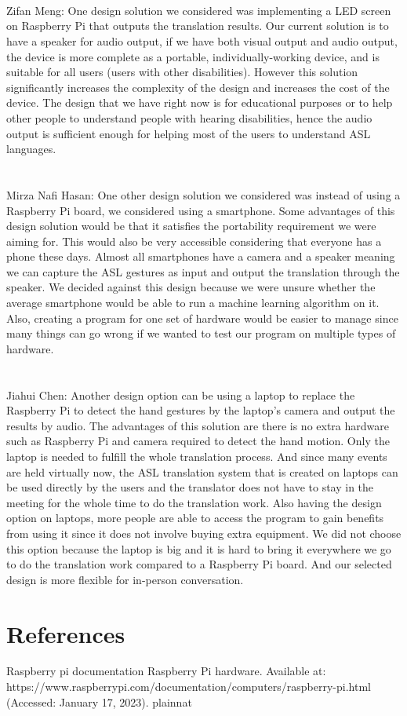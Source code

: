 \documentclass[12pt, titlepage]{article}
\begin{document}
\begin{enumerate}
  \\
  ~\\
  \\
  Zifan Meng: One design solution we considered was implementing a LED screen on Raspberry Pi that outputs the translation results. Our current solution 
  is to have a speaker for audio output, if we have both visual output and audio output, the device is more complete as a portable, individually-working 
  device, and is suitable for all users (users with other disabilities). However this solution significantly increases the complexity of the design and 
  increases the cost of the device. The design that we have right now is for educational purposes or to help other people to understand people with hearing disabilities, 
  hence the audio output is sufficient enough for helping most of the users to understand ASL languages.
  \\
  ~\\
  \\
    Mirza Nafi Hasan: One other design solution we considered was instead of using a Raspberry Pi board, we considered using a smartphone. Some advantages of 
    this design solution would be that it satisfies the portability requirement we were aiming for. This would also be very accessible considering that everyone
    has a phone these days. Almost all smartphones have a camera and a speaker meaning we can capture the ASL gestures as input and output the translation 
    through the speaker. We decided against this design because we were unsure whether the average smartphone would be able to run a machine learning algorithm
    on it. Also, creating a program for one set of hardware would be easier to manage since many things can go wrong if we wanted to test our program on 
    multiple types of hardware.
    \\
    ~\\
    \\
  Jiahui Chen: Another design option can be using a laptop to replace the Raspberry Pi to detect the hand gestures by the laptop's camera and output the results by audio. The advantages of this solution are there is no extra hardware such as Raspberry Pi and camera required to detect the hand motion. Only the laptop is needed to fulfill the whole translation process. And since many events are held virtually now, the ASL translation system that is created on laptops can be used directly by the users and the translator does not have to stay in the meeting for the whole time to do the translation work. Also having the design option on laptops, more people are able to access the program to gain benefits from using it since it does not involve buying extra equipment. We did not choose this option because the laptop is big and it is hard to  bring it everywhere we go to do the translation work compared to a Raspberry Pi board. And our selected design is more flexible for in-person conversation.  
  \\
\end{enumerate}

\section*{References}
Raspberry pi documentation Raspberry Pi hardware. Available at: https://www.raspberrypi.com/documentation/computers/raspberry-pi.html (Accessed: January 17, 2023). 
 {plainnat}

\end{document}
